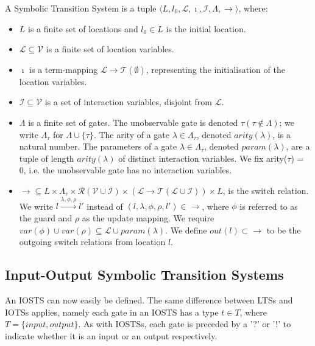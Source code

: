 \begin{definition}
A Symbolic Transition System is a tuple $\langle L,l_0,\mathcal{L},\imath,\mathcal{I},\Lambda,\rightarrow\rangle$, where:
\begin{itemize}
\item $L$ is a finite set of locations and $l_0 \in L$ is the initial location.
\item $\mathcal{L} \subseteq \mathcal{V}$ is a finite set of location variables.
\item $\imath$ is a term-mapping $\mathcal{L} \rightarrow \mathcal{T}(\emptyset)$, representing the initialisation of the location variables.
\item $\mathcal{I} \subseteq \mathcal{V}$ is a set of interaction variables, disjoint from $\mathcal{L}$.
\item $\Lambda$ is a finite set of gates. The unobservable gate is denoted $\tau (\tau \notin \Lambda)$; we write $\Lambda_\tau$ for $\Lambda \cup \{\tau\}$. The arity of a gate $\lambda\in\Lambda_\tau$, denoted $arity(\lambda)$, is a natural number. The parameters of a gate $\lambda\in\Lambda_\tau$, denoted $param(\lambda)$, are a tuple of length $arity(\lambda)$ of distinct interaction variables. We fix arity($\tau$) = 0, i.e. the unobservable gate has no interaction variables.
\item ${\rightarrow} \subseteq L \times \Lambda_\tau \times \mathcal{R}(\mathcal{V} \cup \mathcal{I}) \times (\mathcal{L} \rightarrow \mathcal{T}(\mathcal{L} \cup \mathcal{I})) \times L$, is the switch relation. We write $l\xrightarrow{\lambda,\phi,\rho}l'$ instead of $(l,\lambda,\phi,\rho,l')\in\rightarrow$, where $\phi$ is referred to as the guard and $\rho$ as the update mapping. We require $var(\phi) \cup var(\rho) \subseteq \mathcal{L} \cup param(\lambda)$. We define $out(l) \subset {\rightarrow}$ to be the outgoing switch relations from location $l$.
\end{itemize}
\end{definition}

\subsection{Input-Output Symbolic Transition Systems}
An IOSTS can now easily be defined. The same difference between LTSs and IOTSs applies, namely each gate in an IOSTS has a type $t \in T$, where $T = \{input, output\}$. As with IOSTSs, each gate is preceded by a '?' or '!' to indicate whether it is an input or an output respectively.

